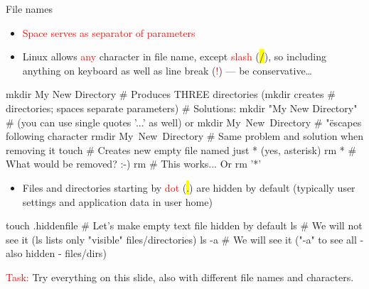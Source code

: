 \documentclass[compress, ucs, xelatex, 11pt, xcolor=svgnames, aspectratio=169,
	hyperref={
		bookmarks=true,
		unicode=true,
		colorlinks=true,
		pdftitle={Linux, command line and MetaCentrum},
		plainpages=false,
		pdfauthor={Vojtech Zeisek},
		pdfsubject={Course about use of Linux command line, writing shell scripts and using MetaCentrum of CESNET},
		pdfcreator={XeLaTeX},
		pdfkeywords={Linux, GNU, BASH, shell, command line, MetaCentrum},
		linkcolor=DarkRed, %
		anchorcolor=DarkBlue, %
		citecolor=Indigo, %
		filecolor=NavyBlue, %
		menucolor=DarkMagenta, %
		urlcolor=DarkBlue, %
		pdftex},
	url={hyphens, lowtilde} %
	]{beamer}
\renewcommand{\texttt}[1]{\hl{\ttfamily #1}}
\renewcommand{\alert}[1]{\textcolor{red}{#1}}
\begin{document}
\begin{frame}[fragile]{File names}
	\label{filenames}
	\begin{itemize}
		\item \alert{Space serves as separator of parameters}
		\item Linux allows \alert{any} character in file name, except \alert{slash} (\texttt{/}), so including anything on keyboard as well as line break (\alert{!}) --- be conservative\ldots
	\end{itemize}
	\begin{bashcode}
    mkdir My New Directory # Produces THREE directories (mkdir creates
                           # directories; spaces separate parameters)
                           # Solutions:
    mkdir "My New Directory" # (you can use single quotes '...' as well) or
    mkdir My\ New\ Directory # "\" escapes following character
    rmdir My\ New\ Directory # Same problem and solution when removing it
    touch \* # Creates new empty file named just * (yes, asterisk)
    rm * # What would be removed? :-)
    rm \* # This works... Or rm '*'
	\end{bashcode}
	\begin{itemize}
		\item Files and directories starting by \alert{dot} (\texttt{.}) are hidden by default (typically user settings and application data in user home)
	\end{itemize}
	\begin{bashcode}
    touch .hiddenfile # Let's make empty text file hidden by default
    ls # We will not see it (ls lists only "visible" files/directories)
    ls -a # We will see it ("-a" to see all - also hidden - files/dirs)
	\end{bashcode}
	\alert{Task:} Try everything on this slide, also with different file names and characters.
\end{frame}
\end{document}
